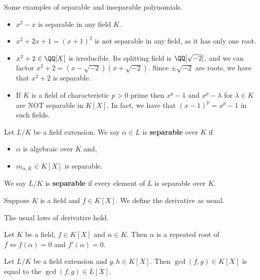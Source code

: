 \documentclass[12pt, a4paper]{article}
\begin{document}
\begin{mdexample}
    Some examples of separable and inseparable polynomials.
    \begin{itemize}
        \item \(x^2-x\) is separable in any field \(K\).
        \item \(x^2+2x+1=(x+1)^2\) is not separable in any field, as it has only one root.
        \item \(x^2+2 \in \QQ[X]\) is irreducible. Its splitting field is \(\QQ[\sqrt{-2}]\), and we can factor \(x^2+2=(x-\sqrt{-2})(x+\sqrt{-2})\). Since \(\pm\sqrt{-2}\) are roots, we have that \(x^2+2\) is separable.
        \item If \(K\) is a field of characteristic \(p>0\) prime then \(x^p-1\) and \(x^p-\lambda\) for \(\lambda\in K\) are NOT separable in \(K[X]\).
        In fact, we have that \((x-1)^p = x^p-1\) in such fields.
    \end{itemize}
\end{mdexample}

\begin{definition}
    Let \(L/K\) be a field extension. We say \(\alpha\in L\) is \textbf{separable} over \(K\) if
    \begin{itemize}
        \item \(\alpha\) is algebraic over \(K\) and,
        \item \(m_{\alpha,K} \in K[X]\) is separable.
    \end{itemize}
    We say \(L/K\) is \textbf{separable} if every element of \(L\) is separable over \(K\).
\end{definition}

\begin{definition}
    Suppose \(K\) is a field and \(f\in K[X]\). We define the derivative as usual.
\end{definition}

\begin{proposition}
    The usual laws of derivative hold.
\end{proposition}

\begin{lemma}
    Let \(K\) be a field, \(f\in K[X]\) and \(\alpha\in K\). Then \(\alpha\) is a repeated root of \(f \iff f(\alpha)=0\)  and \(f'(\alpha)=0\).
\end{lemma}

\begin{lemma}
    Let \(L/K\) be a field extension and \(g,h\in K[X]\). Then \(\gcd(f,g) \in K[X]\) is equal to the \(\gcd(f,g)\in L[X]\).
\end{lemma}
\end{document}
